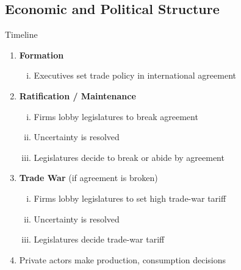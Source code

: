 \documentclass[handout]{beamer}
\begin{document}
\subsection{Economic and Political Structure}
\begin{frame}{Timeline}
\pause
\begin{enumerate}
	\item {\bfseries Formation}
		\begin{enumerate}[i.]
			\pause
			\item Executives set trade policy in international agreement
		\end{enumerate}
	\pause
	\item \textbf{Ratification / Maintenance}
		\begin{enumerate}[i.]
			\pause
			\item Firms lobby legislatures to break agreement
			\pause
			\item Uncertainty is resolved
			\pause
			\item Legislatures decide to break or abide by agreement
			\pause
		\end{enumerate}
	\item \textbf{Trade War} (if agreement is broken)
	\pause
		\begin{enumerate}[i.]
			\item Firms lobby legislatures to set high trade-war tariff
			\pause
			\item Uncertainty is resolved
			\pause
			\item Legislatures decide trade-war tariff
		\end{enumerate}
\pause
	\item Private actors make production, consumption decisions
\end{enumerate}
\end{frame}


\end{document}
